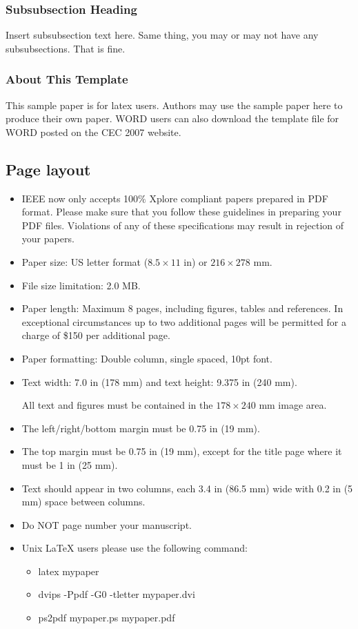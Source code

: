 \documentclass[conference]{IEEEtran}
\begin{document}
\subsubsection{Subsubsection Heading}
Insert subsubsection text here.
Same thing, you may or may not have any subsubsections. That is fine.

\subsubsection{About This Template}
This sample paper is for latex users. Authors may use the sample paper 
here to produce their own paper.
WORD users can also download the template file for WORD posted on the
CEC 2007 website.

\subsection{Page layout}
\begin{itemize}
\item IEEE now only accepts 100$\%$ 
	Xplore compliant papers prepared in PDF format. Please make sure that 
	you follow these guidelines in preparing 
	your PDF files. Violations of any of these specifications 
	may result in rejection of your papers.  
\item Paper size: US letter format ($8.5\times 11$ in) 
or $216\times 278$ mm.
\item File size limitation: 2.0 MB.
\item Paper length: %
Maximum 8 pages, including figures, tables and references.
In exceptional circumstances up to two additional pages will be
permitted for a charge of \$150 per additional page.
\item Paper formatting: Double column, single spaced, 10pt font.
\item Text width: 7.0 in (178 mm) and text height: 9.375 in (240 mm).

All text and figures must be contained in the $178 \times 240$ mm  image area.
\item The left/right/bottom margin must be 0.75 in (19 mm).
\item The top margin must be 0.75 in (19 mm),
 except for the title page where it must be 1 in (25 mm).
\item Text should appear in two columns, each 3.4 in (86.5 mm) wide with 0.2 in
(5 mm) space between columns.
\item Do NOT page number your manuscript.
\item Unix LaTeX users please use the following command:
\begin{itemize}
\item latex mypaper
\item dvips -Ppdf -G0 -tletter mypaper.dvi
\item ps2pdf mypaper.ps mypaper.pdf
\end{itemize}
\end{itemize}
\end{document}
